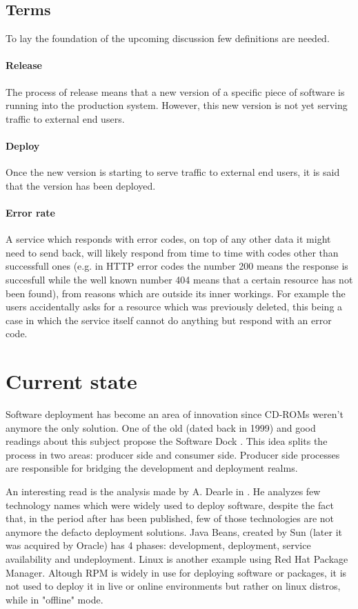 \documentclass[conference]{IEEEtran}
\begin{document}
\subsection{Terms}
    To lay the foundation of the upcoming discussion few definitions are needed.
\paragraph{Release}
    The process of release means that a new version of a specific piece of software is running into the production system. However, this new version is not yet serving traffic to external end users.
\paragraph{Deploy}
    Once the new version is starting to serve traffic to external end users, it is said that the version has been deployed.
\paragraph{Error rate}
    A service which responds with error codes, on top of any other data it might need to send back, will likely respond from time to time with codes other than successfull ones (e.g. in HTTP error codes the number 200 means the response is succesfull while the well known number 404 means that a certain resource has not been found), from reasons which are outside its inner workings. For example the users accidentally asks for a resource which was previously deleted, this being a case in which the service itself cannot do anything but respond with an error code.

\section{Current state}
    Software deployment has become an area of innovation since CD-ROMs weren't anymore the only solution. One of the old (dated back in 1999) and good readings about this subject propose the Software Dock \cite{b1}. This idea splits the process in two areas: producer side and consumer side. Producer side processes are responsible for bridging the development and deployment realms.

    An interesting read is the analysis made by A. Dearle in \cite{b3}. He analyzes few technology names which were widely used to deploy software, despite the fact that, in the period after \cite{b3} has been published, few of those technologies are not anymore the defacto deployment solutions. Java Beans, created by Sun (later it was acquired by Oracle) has 4 phases: development, deployment, service availability and undeployment. Linux is another example using Red Hat Package Manager. Altough RPM is widely in use for deploying software or packages, it is not used to deploy it in live or online environments but rather on linux distros, while in "offline" mode.
\end{document}
